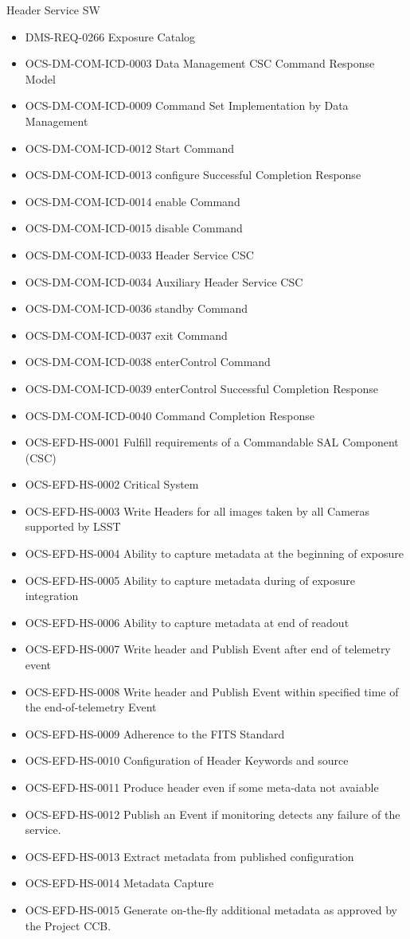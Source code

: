 Header Service SW \begin{itemize}
\item DMS-REQ-0266 Exposure Catalog
\item OCS-DM-COM-ICD-0003 Data Management CSC Command Response Model
\item OCS-DM-COM-ICD-0009 Command Set Implementation by Data Management
\item OCS-DM-COM-ICD-0012 Start Command
\item OCS-DM-COM-ICD-0013 configure Successful Completion Response
\item OCS-DM-COM-ICD-0014 enable Command
\item OCS-DM-COM-ICD-0015 disable Command
\item OCS-DM-COM-ICD-0033 Header Service CSC
\item OCS-DM-COM-ICD-0034 Auxiliary Header Service CSC
\item OCS-DM-COM-ICD-0036 standby Command
\item OCS-DM-COM-ICD-0037 exit Command
\item OCS-DM-COM-ICD-0038 enterControl Command
\item OCS-DM-COM-ICD-0039 enterControl Successful Completion Response
\item OCS-DM-COM-ICD-0040 Command Completion Response
\item OCS-EFD-HS-0001 Fulfill requirements of a Commandable SAL Component (CSC)
\item OCS-EFD-HS-0002 Critical System
\item OCS-EFD-HS-0003 Write Headers for all images taken by all Cameras supported by LSST
\item OCS-EFD-HS-0004 Ability to capture metadata at the beginning of exposure
\item OCS-EFD-HS-0005 Ability to capture metadata during of exposure integration
\item OCS-EFD-HS-0006 Ability to capture metadata at end of readout
\item OCS-EFD-HS-0007 Write header and Publish Event after end of telemetry event
\item OCS-EFD-HS-0008 Write header and Publish Event within specified time of the end-of-telemetry Event
\item OCS-EFD-HS-0009 Adherence to the FITS Standard
\item OCS-EFD-HS-0010 Configuration of Header Keywords and source
\item OCS-EFD-HS-0011 Produce header even if some meta-data not avaiable
\item OCS-EFD-HS-0012 Publish an Event if monitoring detects any failure of the service.
\item OCS-EFD-HS-0013 Extract metadata from published configuration
\item OCS-EFD-HS-0014 Metadata Capture
\item OCS-EFD-HS-0015 Generate on-the-fly additional metadata as approved by the Project CCB.
\end{itemize}
